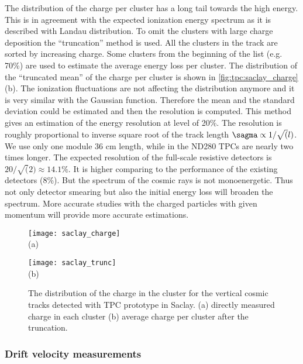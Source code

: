 \documentclass[../main.tex]{subfiles}
\begin{document}
The distribution of the charge per cluster has a long tail towards the high energy. This is in agreement with the expected ionization energy spectrum as it is described with Landau distribution. To omit the clusters with large charge deposition the ``truncation'' method is used. All the clusters in the track are sorted by increasing charge. Some clusters from the beginning of the list (e.g. 70\%) are used to estimate the average energy loss per cluster. The distribution of the ``truncated mean'' of the charge per cluster is shown in \autoref{fig:tpc:saclay_charge} (b). The ionization fluctuations are not affecting the distribution anymore and it is very similar with the Gaussian function. Therefore the mean and the standard deviation could be estimated and then the resolution is computed. This method gives an estimation of the energy resolution at level of 20\%. The resolution is roughly proportional to inverse square root of the track length $\sagma\propto1/\sqrt(l)$. We use only one module 36 cm length, while in the ND280 TPCs are nearly two times longer. The expected resolution of the full-scale resistive detectors is $20/\sqrt(2)\approx14.1\%$. It is higher comparing to the performance of the existing detectors (8\%). But the spectrum of the cosmic rays is not monoenergetic. Thus not only detector smearing but also the initial energy loss will broaden the spectrum. More accurate studies with the charged particles with given momentum will provide more accurate estimations.

\begin{figure}[tb]
  \centering
  \begin{minipage}{0.49\linewidth}
    \centering
    \texttt{[image: saclay\_charge]} \\ (a)
  \end{minipage}
  \begin{minipage}{0.49\linewidth}
    \centering
    \texttt{[image: saclay\_trunc]} \\ (b)
  \end{minipage}
  \caption{The distribution of the charge in the cluster for the vertical cosmic tracks detected with TPC prototype in Saclay. (a) directly measured charge in each cluster (b) average charge per cluster after the truncation.}
  \label{fig:tpc:saclay_charge}
\end{figure}

\subsubsection{Drift velocity measurements}
\label{sec:tpc:drift}
\end{document}
